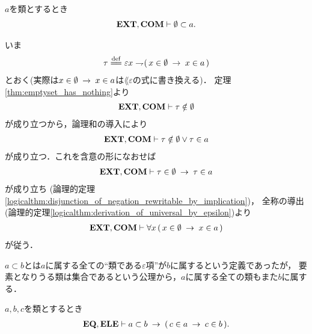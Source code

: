 	\begin{screen}
		\begin{thm}[空集合は全ての類に含まれる]
		\label{thm:emptyset_if_a_subset_of_every_class}
			$a$を類とするとき
			\begin{align}
				\mbox{{\bf EXT}},\mbox{\bf COM} \vdash \emptyset \subset a.
			\end{align}
		\end{thm}
	\end{screen}
	
	\begin{prf}
		いま
		\begin{align}
			\tau \defeq \varepsilon x \negation (\, x \in \emptyset \rarrow x \in a\, )
		\end{align}
		とおく(実際は$x \in \emptyset \hspace{0.25em}\rightarrow\hspace{0.25em} x \in a$は$\lang{\varepsilon}$の式に書き換える)．
		定理\ref{thm:emptyset_has_nothing}より
		\begin{align}
			\mbox{{\bf EXT}},\mbox{\bf COM} \vdash \tau \notin \emptyset
		\end{align}
		が成り立つから，論理和の導入により
		\begin{align}
			\mbox{{\bf EXT}},\mbox{\bf COM} \vdash \tau \notin \emptyset \vee \tau \in a
		\end{align}
		が成り立つ．これを含意の形になおせば
		\begin{align}
			\mbox{{\bf EXT}},\mbox{\bf COM} \vdash \tau \in \emptyset \hspace{0.25em}\rightarrow\hspace{0.25em} \tau \in a
		\end{align}
		が成り立ち
		(論理的定理\ref{logicalthm:disjunction_of_negation_rewritable_by_implication})，
		全称の導出(論理的定理\ref{logicalthm:derivation_of_universal_by_epsilon})より
		\begin{align}
			\mbox{{\bf EXT}},\mbox{\bf COM} \vdash \forall x\, (\, x \in \emptyset \hspace{0.25em}\rightarrow\hspace{0.25em} x \in a\, )
		\end{align}
		が従う．
		\QED
	\end{prf}
	
	$a \subset b$とは$a$に属する全ての``類である$\varepsilon$項''が$b$に属するという定義であったが，
	要素となりうる類は集合であるという公理から，$a$に属する全ての類もまた$b$に属する．
	
	\begin{screen}
		\begin{thm}[類はその部分類に属する全ての類を要素に持つ]
		\label{thm:subclass_contains_all_elements}
			$a,b,c$を類とするとき
			\begin{align}
				\mbox{{\bf EQ}},\mbox{{\bf ELE}} \vdash 
				a \subset b \hspace{0.25em}\rightarrow\hspace{0.25em} (\, c \in a \hspace{0.25em}\rightarrow\hspace{0.25em} c \in b\, ).
			\end{align}
		\end{thm}
	\end{screen}
	
